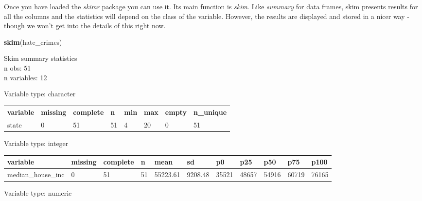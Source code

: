 \documentclass[]{book}
\newenvironment{Shaded}{\begin{snugshade}}{\end{snugshade}}
\newcommand{\KeywordTok}[1]{\textcolor[rgb]{0.13,0.29,0.53}{\textbf{#1}}}
\newcommand{\NormalTok}[1]{#1}
\theoremstyle{definition}
\theoremstyle{definition}
\theoremstyle{definition}
\theoremstyle{remark}
\begin{document}
Once you have loaded the \emph{skimr} package you can use it. Its main
function is \emph{skim}. Like \emph{summary} for data frames, skim
presents results for all the columns and the statistics will depend on
the class of the variable. However, the results are displayed and stored
in a nicer way -though we won't get into the details of this right now.

\begin{Shaded}
\begin{Highlighting}[]
\KeywordTok{skim}\NormalTok{(hate_crimes)}
\end{Highlighting}
\end{Shaded}

Skim summary statistics\\
n obs: 51\\
n variables: 12

Variable type: character

\begin{tabular}{l|l|l|l|l|l|l|l}
\hline
variable & missing & complete & n & min & max & empty & n\_unique\\
\hline
state & 0 & 51 & 51 & 4 & 20 & 0 & 51\\
\hline
\end{tabular}

Variable type: integer

\begin{tabular}{l|l|l|l|l|l|l|l|l|l|l}
\hline
variable & missing & complete & n & mean & sd & p0 & p25 & p50 & p75 & p100\\
\hline
median\_house\_inc & 0 & 51 & 51 & 55223.61 & 9208.48 & 35521 & 48657 & 54916 & 60719 & 76165\\
\hline
\end{tabular}

Variable type: numeric
\end{document}

